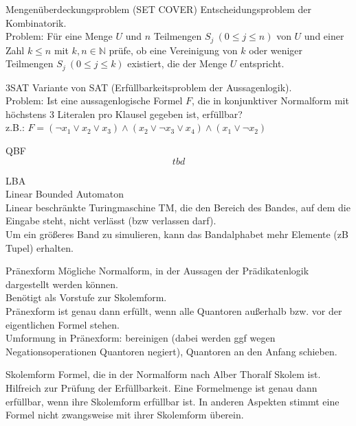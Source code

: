 \documentclass[a7paper,print,grid=both]{kartei}
\begin{document}
\begin{karte}{Mengenüberdeckungsproblem (SET COVER)}
Entscheidungsproblem der Kombinatorik.\\
Problem: Für eine Menge $U$ und $n$ Teilmengen $S_j~(0 \leq j \leq n)$ von $U$ und einer Zahl $k \leq n$ mit $k, n \in \mathbb{N}$ prüfe, ob eine Vereinigung von $k$ oder weniger Teilmengen $S_j~(0 \leq j \leq k)$ existiert, die der Menge $U$ entspricht.
\end{karte}
\begin{karte}{3SAT}
Variante von SAT (Erfüllbarkeitsproblem der Aussagenlogik).\\
Problem: Ist eine aussagenlogische Formel $F$, die in konjunktiver Normalform mit höchstens 3 Literalen pro Klausel gegeben ist, erfüllbar?\\
z.B.: $F = (\lnot x_1\lor x_2\lor x_3)\land(x_2\lor\lnot x_3 \lor x_4)\land(x_1\lor\lnot x_2)$
\end{karte}
\begin{karte}{QBF}
\[tbd\]
\end{karte}
\begin{karte}{LBA\\Linear Bounded Automaton\\Linear beschränkte Turingmaschine}
TM, die den Bereich des Bandes, auf dem die Eingabe steht, nicht verlässt (bzw verlassen darf).\\
Um ein größeres Band zu simulieren, kann das Bandalphabet mehr Elemente (zB Tupel) erhalten.
\end{karte}
\begin{karte}{Pränexform}
Mögliche Normalform, in der Aussagen der Prädikatenlogik dargestellt werden können.\\
Benötigt als Vorstufe zur Skolemform.\\
Pränexform ist genau dann erfüllt, wenn alle Quantoren außerhalb bzw. vor der eigentlichen Formel stehen.\\
Umformung in Pränexform: bereinigen (dabei werden ggf wegen Negationsoperationen Quantoren negiert), Quantoren an den Anfang schieben.
\end{karte}
\begin{karte}{Skolemform}
Formel, die in der Normalform nach Alber Thoralf Skolem ist.\\
Hilfreich zur Prüfung der Erfüllbarkeit. Eine Formelmenge ist genau dann erfüllbar, wenn ihre Skolemform erfüllbar ist. In anderen Aspekten stimmt eine Formel nicht zwangsweise mit ihrer Skolemform überein.
\end{karte}
\end{document}
